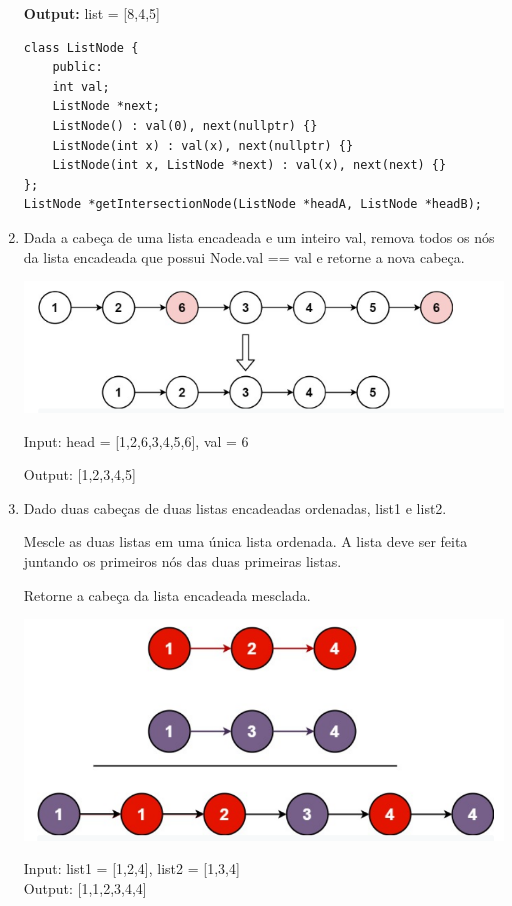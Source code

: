 \begin{enumerate}
\textbf{Output:} list = [8,4,5]



\begin{verbatim}
class ListNode {
    public:
    int val;
    ListNode *next;
    ListNode() : val(0), next(nullptr) {}
    ListNode(int x) : val(x), next(nullptr) {}
    ListNode(int x, ListNode *next) : val(x), next(next) {}
};
ListNode *getIntersectionNode(ListNode *headA, ListNode *headB);
\end{verbatim}

\item Dada a cabeça de uma lista encadeada e um inteiro val, remova todos os nós da lista encadeada que possui Node.val == val e retorne a nova cabeça.

\includegraphics[scale=0.5]{images/removeElements.png}

Input: head = [1,2,6,3,4,5,6], val = 6

Output: [1,2,3,4,5]

\item Dado duas cabeças de duas listas encadeadas ordenadas, list1 e list2.

Mescle as duas listas em uma única lista ordenada. A lista deve ser feita juntando os primeiros nós das duas primeiras listas.

Retorne a cabeça da lista encadeada mesclada.

\includegraphics[scale=0.5]{images/mergelist.png}

Input: list1 = [1,2,4], list2 = [1,3,4]\\
Output: [1,1,2,3,4,4]\\


\end{enumerate}
